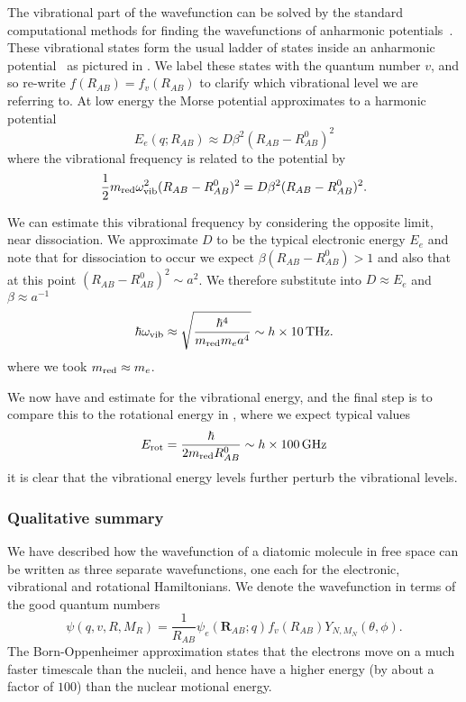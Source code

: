 The vibrational part of the wavefunction can be solved by the standard
computational methods for finding the wavefunctions of anharmonic
potentials~\cite{Foot2005}. These vibrational states form the usual ladder of
states inside an anharmonic potential~\cite{Binney} as pictured in
. We label these states with the quantum number
$v$, and so re-write $f(R_{AB}) = f_v(R_{AB})$ to clarify which vibrational
level we are referring to. At low energy the Morse potential approximates
to a harmonic potential
%
\begin{equation}
  E_e(q; R_{AB}) \approx D\beta^2(R_{AB} - R_{AB}^0)^2
\end{equation}
%
where the vibrational frequency is related to the potential by
%
\begin{equation}
  \frac{1}{2}m_\text{red}{}\omega_\text{vib}^2(R_{AB}-R_{AB}^0)^2 = D\beta^2(R_{AB}-R_{AB}^0)^2.
  \label{theory:eqn:vibfreqrel}
\end{equation}  
%

We can estimate this vibrational frequency by considering the opposite limit,
near dissociation. We approximate $D$ to be the typical electronic energy $E_e$
and note that for dissociation to occur we expect $\beta(R_{AB} - R_{AB}^0) >
1$ and also that at this point $(R_{AB} - R_{AB}^0)^2\sim a^2$. We therefore
substitute into  $D\approx E_e$ and
$\beta\approx a^{-1}$
%
\begin{equation}
  \hbar\omega_\text{vib} \approx \sqrt{\frac{\hbar^4}{\mred{} m_e a^4}} \sim
    h\times\SI{10}{\tera\hertz}.
\end{equation}
%
where we took $m_\text{red}{}\approx m_e$.

We now have and estimate for the vibrational energy, and the final step is to
compare this to the rotational energy in , where
we expect typical values
%
\begin{equation}
  E_\text{rot} = \frac{\hbar}{2 m_\text{red}{} R^0_{AB}} \sim h\times\SI{100}{\giga\hertz}
\end{equation}
%
it is clear that the vibrational energy levels further perturb the vibrational
levels.

\subsubsection{Qualitative summary}

We have described how the wavefunction of a diatomic molecule in free space can
be written as three separate wavefunctions, one each for the electronic,
vibrational and rotational Hamiltonians. We denote the wavefunction in terms of
the good quantum numbers
%
\begin{equation}
  \psi(q, v, R, M_R) = \frac{1}{R_{AB}}\psi_e(\mathbf{R}_{AB};q)
  f_v(R_{AB})Y_{N, M_N}(\theta, \phi).
\end{equation}
%
The Born-Oppenheimer approximation states that the electrons move on a much
faster timescale than the nucleii, and hence have a higher energy (by about a
factor of $100$) than the nuclear motional energy.

